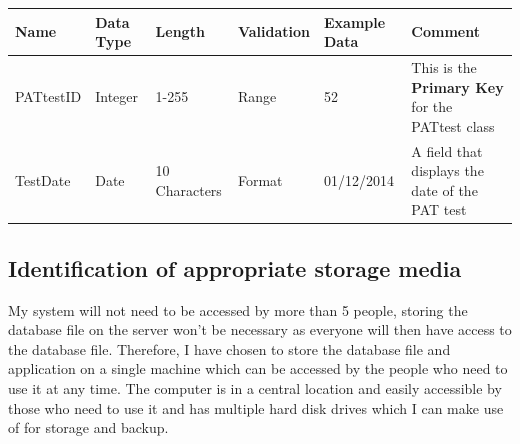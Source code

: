\begin{landscape}
    \begin{center}
        \begin{tabular}{|p{2.3cm}|p{2cm}|p{3cm}|p{2cm}|p{4.6cm}|p{4cm}|}
            \hline
            \textbf{Name} & \textbf{Data Type} & \textbf{Length} & \textbf{Validation} & \textbf{Example Data} & \textbf{Comment} \\ \hline
            PATtestID    & Integer  & 1-255         & Range  & 52         & This is the \textbf{Primary Key} for the PATtest class \\ \hline
            TestDate     & Date     & 10 Characters & Format & 01/12/2014 & A field that displays the date of the PAT test \\ \hline
        \end{tabular}
    \end{center}
\end{landscape}

\subsection{Identification of appropriate storage media}

My system will not need to be accessed by more than 5 people, storing the database file on the server won't be necessary as everyone will then have access to the database file. Therefore, I have chosen to store the database file and application on a single machine which can be accessed by the people who need to use it at any time. The computer is in a central location and easily accessible by those who need to use it and has multiple hard disk drives which I can make use of for storage and backup.  

\newpage

